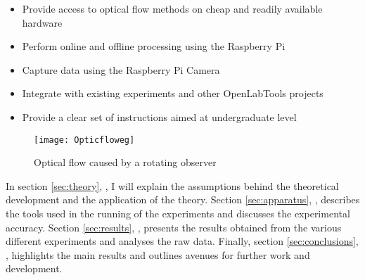 \begin{itemize}
  \item Provide access to optical flow methods on cheap and readily available hardware
  \item Perform online and offline processing using the Raspberry Pi
  \item Capture data using the Raspberry Pi Camera
  \item Integrate with existing experiments and other OpenLabTools projects
  \item Provide a clear set of instructions aimed at undergraduate level
\end{itemize}

\begin{figure}[htpb]
  \centering
  \texttt{[image: Opticfloweg]}
  \caption{Optical flow caused by a rotating observer~\cite{huston2008visuomotor}}
  \label{fig:opticalflow}
\end{figure}

In section \ref{sec:theory}, , I will explain the assumptions behind the theoretical development and the application of the theory. Section \ref{sec:apparatus}, , describes the tools used in the running of the experiments and discusses the experimental accuracy. Section \ref{sec:results}, , presents the results obtained from the various different experiments and analyses the raw data. Finally,  section \ref{sec:conclusions}, , highlights the main results and outlines avenues for further work and development.